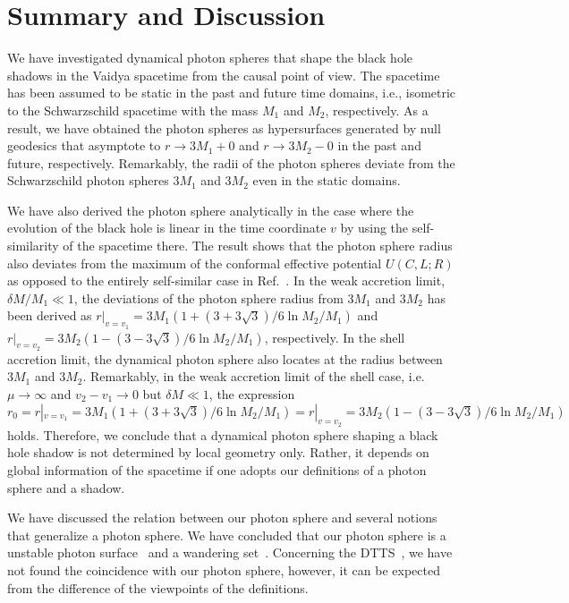 \documentclass[prd,showpacs,preprintnumbers,groupedaddress,superscriptaddress,nofootinbib,11pt]{revtex4-1} %
\theoremstyle{newplain}
\begin{document}
\section{Summary and Discussion}
\label{sec:summary}
We have investigated dynamical photon spheres that shape the black hole shadows in the Vaidya spacetime from the causal point of view.
The spacetime has been assumed to be static in the past and future time domains, i.e., isometric to the Schwarzschild spacetime with the mass $M_1$ and $M_2$, respectively.
As a result, we have obtained the photon spheres as hypersurfaces generated by null geodesics that asymptote to $r\to3M_1+0$ and $r\to3M_2-0$ in the past and future, respectively.
Remarkably, the radii of the photon spheres deviate from the Schwarzschild photon spheres $3M_1$ and $3M_2$ even in the static domains.
\par
We have also derived the photon sphere analytically in the case where the evolution of the black hole is linear in the time coordinate $v$ by using the self-similarity of the spacetime there.
The result shows that the photon sphere radius also deviates from the maximum of the conformal effective potential $U(C,L;R)$ as opposed to the entirely self-similar case in Ref.~\cite{Solanki_2022}.
In the weak accretion limit, $\delta M/M_1\ll1$, the deviations of the photon sphere radius from $3M_1$ and $3M_2$ has been derived as $r|_{v=v_1}=3M_1(1+(3+3\sqrt{3})/6\ln M_2/M_1)$ and $r|_{v=v_2}=3M_2(1-(3-3\sqrt{3})/6\ln M_2/M_1)$, respectively.
In the shell accretion limit,
the dynamical photon sphere also locates at the radius between $3M_1$ and $3 M_2$.
Remarkably, in the weak accretion limit of the shell case, i.e. $\mu\to\infty$ and $v_2-v_1\to0$ but $\delta M\ll1$, the expression $r_0=r|_{v=v_1}=3M_1(1+(3+3\sqrt{3})/6\ln M_2/M_1)=r|_{v=v_2}=3M_2(1-(3-3\sqrt{3})/6\ln M_2/M_1)$ holds.
Therefore, we conclude that a dynamical photon sphere shaping a black hole shadow is not determined by local geometry only.
Rather, it depends on global information of the spacetime if one adopts our definitions of a photon sphere and a shadow.
\par
We have discussed the relation between our photon sphere and several notions that generalize a photon sphere.
We have concluded that our photon sphere is a unstable photon surface~\cite{claudel,koga_2019} and a wandering set~\cite{siino_2019,siino_2021}.
Concerning the DTTS~\cite{yoshino_dtts}, we have not found the coincidence with our photon sphere, however, it can be expected from the difference of the viewpoints of the definitions.
\end{document}
